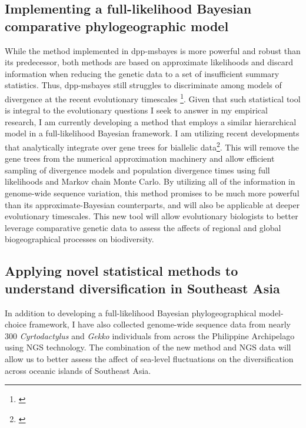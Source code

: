 \subsection*{Implementing a full-likelihood Bayesian comparative
    phylogeographic model}
While the method implemented in dpp-msbayes is more powerful and robust than
its predecessor, both methods are based on approximate likelihoods and discard
information when reducing the genetic data to a set of insufficient summary
statistics.
Thus, dpp-msbayes still struggles to discriminate among models of divergence at
the recent evolutionary timescales \footnote{\label{Oaks14dpp}}.
Given that such statistical tool is integral to the evolutionary questions
I seek to answer in my empirical research,
I am currently developing a method that employs a similar hierarchical model in
a full-likelihood Bayesian framework.
I am utilizing recent developments that analytically integrate over gene trees
for biallelic data\footnote{\label{Bryant12}}.
This will remove the gene trees from the numerical approximation machinery and
allow efficient sampling of divergence models and population divergence times
using full likelihoods and Markov chain Monte Carlo.
By utilizing all of the information in genome-wide sequence variation, this
method promises to be much more powerful than its approximate-Bayesian
counterparts, and will also be applicable at deeper evolutionary timescales.
This new tool will allow evolutionary biologists to better leverage comparative
genetic data to assess the affects of regional and global biogeographical
processes on biodiversity.

\subsection*{Applying novel statistical methods to understand diversification
    in Southeast Asia}
In addition to developing a full-likelihood Bayesian phylogeographical
model-choice framework, I have also collected genome-wide sequence data from
nearly 300 \emph{Cyrtodactylus} and \emph{Gekko} individuals from across the
Philippine Archipelago using NGS technology.
The combination of the new method and NGS data will allow us to better assess
the affect of sea-level fluctuations on the diversification across oceanic
islands of Southeast Asia.

